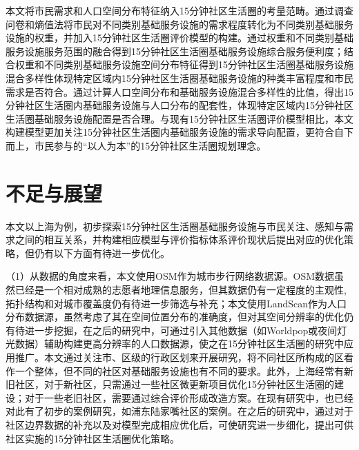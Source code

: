 \documentclass{shnuthesis}
\begin{document}
本文将市民需求和人口空间分布特征纳入15分钟社区生活圈的考量范畴。通过调查问卷和熵值法将市民对不同类别基础服务设施的需求程度转化为不同类别基础服务设施的权重，并加入15分钟社区生活圈评价模型的构建。通过权重和不同类别基础服务设施服务范围的融合得到15分钟社区生活圈基础服务设施综合服务便利度；结合权重和不同类别基础服务设施空间分布特征得到15分钟社区生活圈基础服务设施混合多样性体现特定区域内15分钟社区生活圈基础服务设施的种类丰富程度和市民需求是否符合。通过计算人口空间分布和基础服务设施混合多样性的比值，得出15分钟社区生活圈内基础服务设施与人口分布的配套性，体现特定区域内15分钟社区生活圈基础服务设施配置是否合理。与现有15分钟社区生活圈评价模型相比，本文构建模型更加关注15分钟社区生活圈内基础服务设施的需求导向配置，更符合自下而上，市民参与的“以人为本”的15分钟社区生活圈规划理念。

\section{不足与展望}

本文以上海为例，初步探索15分钟社区生活圈基础服务设施与市民关注、感知与需求之间的相互关系，并构建相应模型与评价指标体系评价现状后提出对应的优化策略，但仍有以下方面有待进一步优化。

（1）从数据的角度来看，本文使用OSM作为城市步行网络数据源。OSM数据虽然已经是一个相对成熟的志愿者地理信息服务，但其数据仍有一定程度的主观性,拓扑结构和对城市覆盖度仍有待进一步筛选与补充；本文使用LandScan作为人口分布数据源，虽然考虑了其在空间位置分布的准确度，但对其空间分辨率的优化仍有待进一步挖掘，在之后的研究中，可通过引入其他数据（如Worldpop或夜间灯光数据）辅助构建更高分辨率的人口数据源，使之在15分钟社区生活圈的研究中应用推广。本文通过关注市、区级的行政区划来开展研究，将不同社区所构成的区看作一个整体，但不同的社区对基础服务设施也有不同的要求。此外，上海经常有新旧社区，对于新社区，只需通过一些社区微更新项目优化15分钟社区生活圈的建设；对于一些老旧社区，需要通过综合评价形成改造方案。在现有研究中，也已经对此有了初步的案例研究，如浦东陆家嘴社区的案例\textsuperscript{\cite{zhao2018}}。在之后的研究中，通过对于社区边界数据的补充以及对模型完成相应优化后，可使研究进一步细化，提出可供社区实施的15分钟社区生活圈优化策略。
\end{document}
